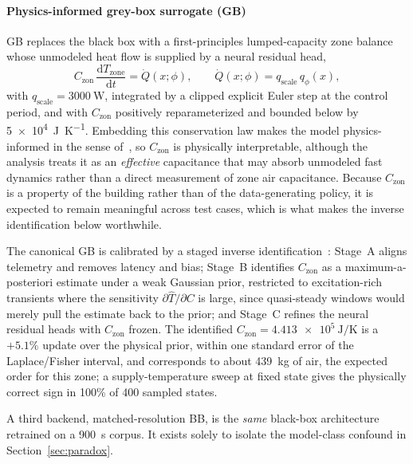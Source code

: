 \documentclass[energies,article,submit,moreauthors]{Definitions/mdpi}
\newcommand{\Czon}{\ensuremath{C_{\mathrm{zon}}}}
\begin{document}
\paragraph{Physics-informed grey-box surrogate (GB)}
GB replaces the black box with a first-principles lumped-capacity zone balance whose unmodeled heat
flow is supplied by a neural residual head,
\begin{equation}
\Czon\,\frac{\mathrm{d}T_{\mathrm{zone}}}{\mathrm{d}t}=\dot{Q}(x;\phi),
\qquad \dot{Q}(x;\phi)=q_{\mathrm{scale}}\,q_\phi(x),
\label{eq:rc}
\end{equation}
with $q_{\mathrm{scale}}=\SI{3000}{\watt}$, integrated by a clipped explicit Euler step at the
control period, and with \Czon{} positively reparameterized and bounded below by
\SI{5e4}{\joule\per\kelvin}. Embedding this conservation law makes the model physics-informed in the
sense of~\cite{Raissi2019PINN,Karpatne2017TheoryGuided,Willard2022PIML,Hedayat2025PINN}, so \Czon{}
is physically interpretable, although the analysis treats it as an \emph{effective} capacitance that
may absorb unmodeled fast dynamics rather than a direct measurement of zone air capacitance. Because
\Czon{} is a property of the building rather than of the data-generating policy, it is expected to
remain meaningful across test cases, which is what makes the inverse identification below
worthwhile.

The canonical GB is calibrated by a staged inverse
identification~\cite{Bacher2011RCIdentification}: Stage~A aligns telemetry and removes latency and
bias; Stage~B identifies \Czon{} as a maximum-a-posteriori estimate under a weak Gaussian prior,
restricted to excitation-rich transients where the sensitivity $\partial\widehat{T}/\partial C$ is
large, since quasi-steady windows would merely pull the estimate back to the prior; and Stage~C
refines the neural residual heads with \Czon{} frozen. The identified
$\Czon=\SI{4.413e5}{\joule\per\kelvin}$ is a $+5.1\%$ update over the physical prior, within one
standard error of the Laplace/Fisher interval, and corresponds to about \SI{439}{\kilogram} of air,
the expected order for this zone; a supply-temperature sweep at fixed state gives the physically
correct sign in 100\% of 400 sampled states.

A third backend, matched-resolution BB, is the \emph{same} black-box architecture retrained on a
\SI{900}{\second} corpus. It exists solely to isolate the model-class confound in
Section~\ref{sec:paradox}.
\end{document}
